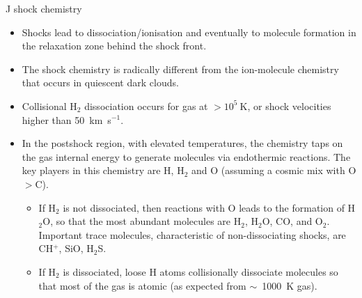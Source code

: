 \begin{frame}{J shock chemistry}

\begin{itemize}
\item Shocks lead to dissociation/ionisation and eventually to
  molecule formation in the relaxation zone behind the shock front. 

\item  The shock chemistry is radically different from the
  ion-molecule chemistry that occurs in quiescent dark clouds. 

\item Collisional H$_2$ dissociation occurs for gas at $>10^5~$K, or
  shock velocities higher than 50~km~s$^{-1}$. 

\item In the postshock region, with elevated temperatures, the
  chemistry taps on the gas internal energy to generate molecules via
  endothermic reactions.  The key players in this chemistry are H,
  H$_2$ and O (assuming a cosmic mix with O$>$C). 

  \begin{itemize}
    \item If H$_2$ is not dissociated, then reactions with O leads to
      the formation of H$_2$O, so that the most abundant molecules are
      H$_2$, H$_2$O, CO, and O$_2$. Important trace molecules,
      characteristic of non-dissociating shocks, are CH$^+$, SiO,
      H$_2$S. 

      \item If H$_2$ is dissociated, loose H atoms collisionally
        dissociate molecules so that most of the gas is atomic (as
        expected from $\sim$~1000~K gas). 
\end{itemize}
\end{itemize}

\end{frame}





